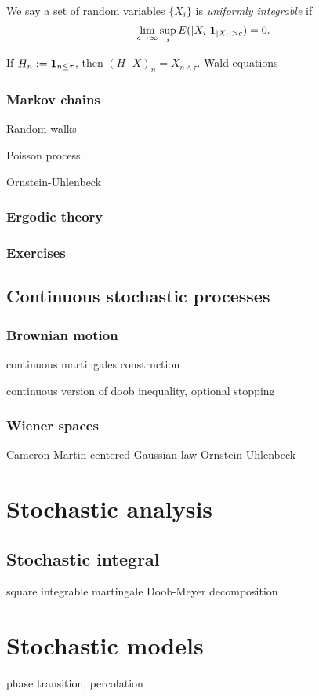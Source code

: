 \documentclass{../../large}
\begin{document}
\begin{prb}
We say a set of random variables $\{X_i\}$ is \emph{uniformly integrable} if
\[\lim_{c\to\infty}\sup_iE(|X_i|\1_{|X_i|>c})=0.\]
\end{prb}


\begin{prb}
If $H_n:=\mathbf{1}_{n\le\tau}$, then $(H\cdot X)_n=X_{n\wedge\tau}$.
Wald equations
\end{prb}



\section{Markov chains}


Random walks

Poisson process

Ornstein-Uhlenbeck

\section{Ergodic theory}



\section*{Exercises}



\chapter{Continuous stochastic processes}

\section{Brownian motion}

continuous martingales
construction

continuous version of doob inequality, optional stopping

\section{Wiener spaces}
Cameron-Martin
centered Gaussian law
Ornstein-Uhlenbeck




\part{Stochastic analysis}

\chapter{Stochastic integral}

square integrable martingale
Doob-Meyer decomposition


\part{Stochastic models}

phase transition, percolation
\end{document}
